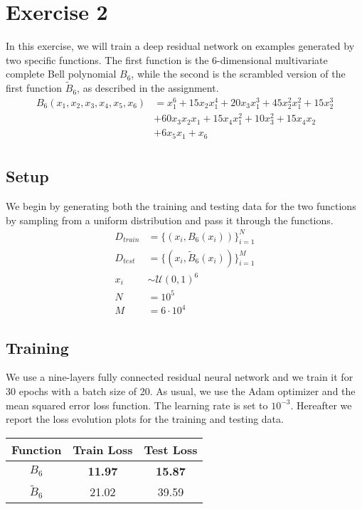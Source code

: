 \section{Exercise 2}

In this exercise, we will train a deep residual network on examples
generated by two specific functions. The first function is the 
6-dimensional multivariate complete Bell polynomial $B_6$, while
the second is the scrambled version of the first function $\tilde{B}_6$, as
described in the assignment.
\begin{align*}
    B_6(x_1, x_2, x_3, x_4, x_5, x_6) &= x_1^6 + 15x_2x_1^4 + 20x_3x_1^3 + 45x_2^2x_1^2 + 15x_2^3 \\
                                      &+ 60x_3x_2x_1 + 15x_4x_1^2 + 10x_3^2 + 15x_4x_2 \\
                                      &+ 6x_5x_1 + x_6 \\
\end{align*}


\subsection{Setup}

We begin by generating both the training and testing data for the two functions
by sampling from a uniform distribution and pass it through the functions.
\begin{align*}
    D_{train} &= \{(x_i, B_6(x_i))\}_{i=1}^{N}
    \\
    D_{test} &= \{(x_i, \tilde{B}_6(x_i))\}_{i=1}^{M}
    \\
    x_i &\sim \mathcal{U}(0, 1)^6
    \\
    N &= 10^5 \\
    M &= 6 \cdot 10^4
\end{align*}


\subsection{Training}

We use a nine-layers fully connected residual neural network and we train
it for 30 epochs with a batch size of 20. As usual, we use the Adam optimizer
and the mean squared error loss function. The learning rate is set to $10^{-3}$.
Hereafter we report the loss evolution plots for the training and testing data.


\begin{table}[H]
    \centering
    \begin{tabular}{c|cc}
        \toprule
        \textbf{Function} & Train Loss & Test Loss \\
        \midrule
        $B_6$ & \textbf{11.97} & \textbf{15.87} \\
        $\tilde{B}_6$ & 21.02 & 39.59 \\
        \bottomrule
    \end{tabular}
\end{table}

